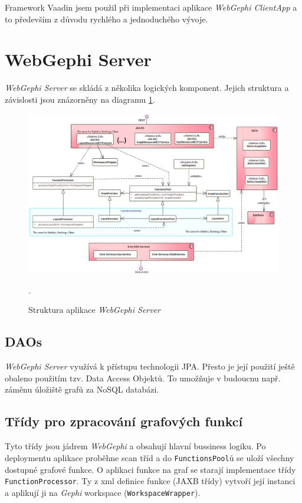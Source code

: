\documentclass[thesis=M,czech]{FITthesis}[2014/05/6]
\begin{document}
Framework Vaadin jsem použil při implementaci aplikace \textit{WebGephi ClientApp} a to především z důvodu rychlého a jednoduchého vývoje.

\section{WebGephi Server}
\textit{WebGephi Server} se skládá z několika logických komponent. Jejich struktura a závislosti jsou znázorněny na diagramu \ref{fig:webgephi-server-impl}.

\begin{figure}\centering
 	\includegraphics[width=1\textwidth]{images/diagram/webgephi-server-impl}
 	\caption[Struktura aplikace \textit{WebGephi Server}]{Struktura aplikace \textit{WebGephi Server}}.\label{fig:webgephi-server-impl}
\end{figure}

\subsection{DAOs}
\textit{WebGephi Server} využívá k přístupu technologii JPA. Přesto je její použití ještě obaleno použitím tzv. Data Access Objektů.
To umožňuje v budoucnu např. záměnu úložiště grafů za NoSQL databázi.

\subsection{Třídy pro zpracování grafových funkcí}
Tyto třídy jsou jádrem \textit{WebGephi} a obsahují hlavní bussiness logiku. Po deploymentu aplikace proběhne scan tříd a do \texttt{FunctionsPool}ů se uloží všechny dostupné 
grafové funkce. O aplikaci funkce na graf se starají implementace třídy \texttt{FunctionProcessor}. Ty z xml definice funkce (JAXB třídy) vytvoří její instanci a aplikují
ji na \textit{Gephi} workspace (\texttt{WorkspaceWrapper}).
\end{document}

